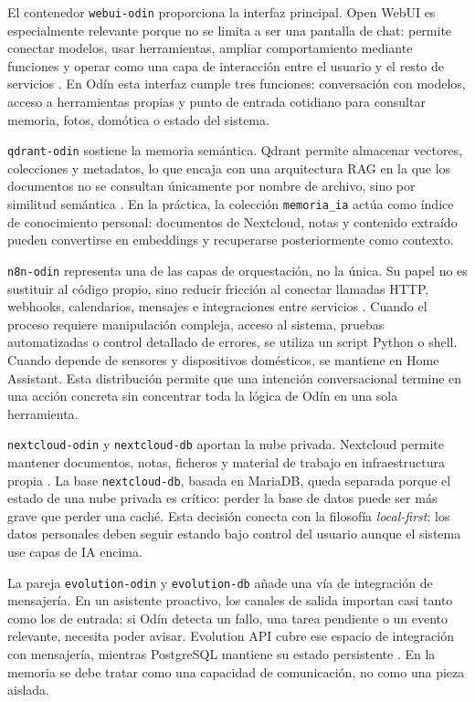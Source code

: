El contenedor \texttt{webui-odin} proporciona la interfaz principal. Open WebUI es especialmente relevante porque no se limita a ser una pantalla de chat: permite conectar modelos, usar herramientas, ampliar comportamiento mediante funciones y operar como una capa de interacción entre el usuario y el resto de servicios \citep{openwebuiDocs,openwebuiToolsDocs,openwebuiFunctionsDocs}. En Odín esta interfaz cumple tres funciones: conversación con modelos, acceso a herramientas propias y punto de entrada cotidiano para consultar memoria, fotos, domótica o estado del sistema.

\texttt{qdrant-odin} sostiene la memoria semántica. Qdrant permite almacenar vectores, colecciones y metadatos, lo que encaja con una arquitectura RAG en la que los documentos no se consultan únicamente por nombre de archivo, sino por similitud semántica \citep{qdrantDocs,qdrantStorageDocs}. En la práctica, la colección \texttt{memoria\_ia} actúa como índice de conocimiento personal: documentos de Nextcloud, notas y contenido extraído pueden convertirse en embeddings y recuperarse posteriormente como contexto.

\texttt{n8n-odin} representa una de las capas de orquestación, no la única. Su papel no es sustituir al código propio, sino reducir fricción al conectar llamadas HTTP, webhooks, calendarios, mensajes e integraciones entre servicios \citep{n8nDocs,n8nDockerDocs}. Cuando el proceso requiere manipulación compleja, acceso al sistema, pruebas automatizadas o control detallado de errores, se utiliza un script Python o shell. Cuando depende de sensores y dispositivos domésticos, se mantiene en Home Assistant. Esta distribución permite que una intención conversacional termine en una acción concreta sin concentrar toda la lógica de Odín en una sola herramienta.

\texttt{nextcloud-odin} y \texttt{nextcloud-db} aportan la nube privada. Nextcloud permite mantener documentos, notas, ficheros y material de trabajo en infraestructura propia \citep{nextcloudDocs}. La base \texttt{nextcloud-db}, basada en MariaDB, queda separada porque el estado de una nube privada es crítico: perder la base de datos puede ser más grave que perder una caché. Esta decisión conecta con la filosofía \textit{local-first}: los datos personales deben seguir estando bajo control del usuario aunque el sistema use capas de IA encima.

La pareja \texttt{evolution-odin} y \texttt{evolution-db} añade una vía de integración de mensajería. En un asistente proactivo, los canales de salida importan casi tanto como los de entrada: si Odín detecta un fallo, una tarea pendiente o un evento relevante, necesita poder avisar. Evolution API cubre ese espacio de integración con mensajería, mientras PostgreSQL mantiene su estado persistente \citep{evolutionApiDocs,postgres15Docs}. En la memoria se debe tratar como una capacidad de comunicación, no como una pieza aislada.

